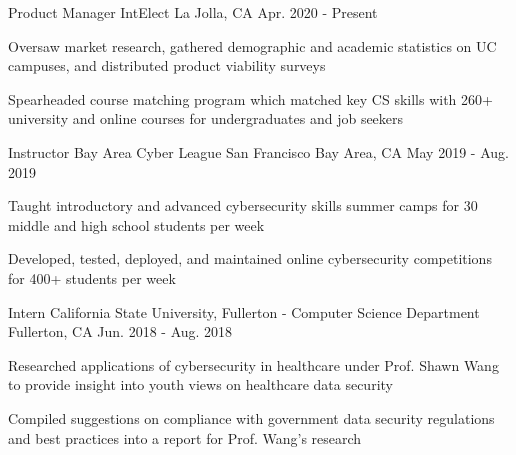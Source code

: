 

\begin{cventries}

\cventry
{Product Manager} %
{IntElect} %
{La Jolla, CA} %
{Apr. 2020 - Present} %
{
  \begin{cvitems} %
    \item {Oversaw market research, gathered demographic and academic statistics on UC campuses, and distributed product viability surveys}
    \item {Spearheaded course matching program which matched key CS skills with 260+ university and online courses for undergraduates and job seekers}
  \end{cvitems}
}

  \cventry
    {Instructor} %
    {Bay Area Cyber League} %
    {San Francisco Bay Area, CA} %
    {May 2019 - Aug. 2019} %
    {
      \begin{cvitems} %
        \item {Taught introductory and advanced cybersecurity skills summer camps for 30 middle and high school students per week}
        \item {Developed, tested, deployed, and maintained online cybersecurity competitions for 400+ students per week}
      \end{cvitems}
    }

  \cventry
    {Intern} %
    {California State University, Fullerton - Computer Science Department} %
    {Fullerton, CA} %
    {Jun. 2018 - Aug. 2018} %
    {
      \begin{cvitems} %
        \item {Researched applications of cybersecurity in healthcare under Prof. Shawn Wang to provide insight into youth views on healthcare data security}
        \item {Compiled suggestions on compliance with government data security regulations and best practices into a report for Prof. Wang's research}
      \end{cvitems}
    }

\end{cventries}
